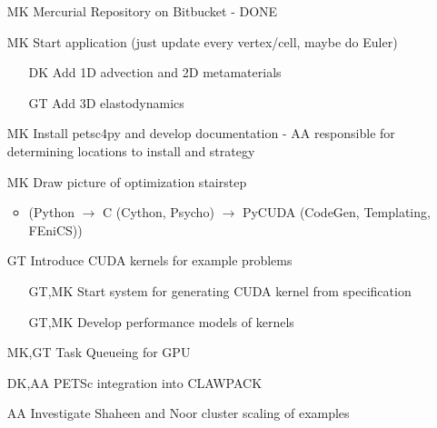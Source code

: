 \documentclass[12pt]{article}
\begin{document}
\begin{itemize}
  \item[MK] Mercurial Repository on Bitbucket - DONE

  \item[MK] Start application (just update every vertex/cell, maybe do Euler)

  \begin{itemize}
    \item[DK] Add 1D advection and 2D metamaterials

    \item[GT] Add 3D elastodynamics
  \end{itemize}

  \item[MK] Install petsc4py and develop documentation - AA
    responsible for determining locations to install and strategy

  \item[MK] Draw picture of optimization stairstep
  \begin{itemize}
    \item (Python $\to$ C (Cython, Psycho) $\to$ PyCUDA (CodeGen, Templating, FEniCS))
  \end{itemize}

  \item[GT] Introduce CUDA kernels for example problems
  \begin{itemize}
    \item[GT,MK] Start system for generating CUDA kernel from
      specification

    \item[GT,MK] Develop performance models of kernels
  \end{itemize}

  \item[MK,GT] Task Queueing for GPU

  \item[DK,AA] PETSc integration into CLAWPACK

  \item[AA] Investigate Shaheen and Noor cluster scaling of examples
\end{itemize}
\end{document}
